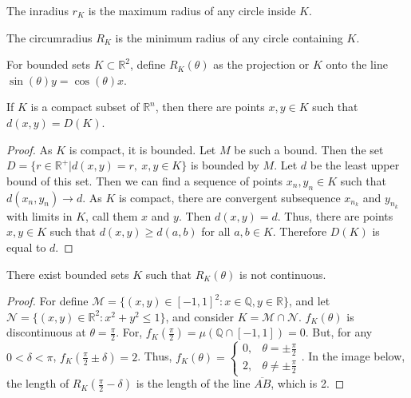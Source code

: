 \documentclass[crop=false,class=book,oneside]{standalone}
\begin{document}
            \begin{definition}
            The inradius $r_K$ is the maximum radius of any circle inside $K$.
            \end{definition}
            \begin{definition}
            The circumradius $R_K$ is the minimum radius of any circle containing $K$.
            \end{definition}
            \begin{notation}
            For bounded sets $K\subset \mathbb{R}^2$, define $R_K(\theta)$ as the projection or $K$ onto the line $\sin(\theta)y=\cos(\theta)x$.
            \end{notation}
            \begin{theorem}
            If $K$ is a compact subset of $\mathbb{R}^n$, then there are points $x,y\in K$ such that $d(x,y)=D(K)$.
            \end{theorem}
            \begin{proof}
            As $K$ is compact, it is bounded. Let $M$ be such a bound. Then the set $D=\{r\in \mathbb{R}^+| d(x,y) = r,\ x,y\in K\}$ is bounded by $M$. Let $d$ be the least upper bound of this set. Then we can find a sequence of points $x_n,y_n\in K$ such that $d(x_n,y_n) \rightarrow d$. As $K$ is compact, there are convergent subsequence $x_{n_k}$ and $y_{n_k}$ with limits in $K$, call them $x$ and $y$. Then $d(x,y) = d$. Thus, there are points $x,y\in K$ such that $d(x,y) \geq d(a,b)$ for all $a,b\in K$. Therefore $D(K)$ is equal to $d$.
            \end{proof}
            \begin{theorem}
            There exist bounded sets $K$ such that $R_K(\theta)$ is not continuous.
            \end{theorem}
            \begin{proof}
            For define $\mathcal{M} = \{(x,y)\in [-1,1]^2: x\in \mathbb{Q},y\in \mathbb{R}\}$, and let $\mathcal{N} = \{(x,y)\in \mathbb{R}^2: x^2+y^2\leq 1\}$, and consider $K = \mathcal{M}\cap \mathcal{N}$. $f_{K}(\theta)$ is discontinuous at $\theta = \frac{\pi}{2}$. For, $f_K(\frac{\pi}{2}) = \mu(\mathbb{Q}\cap [-1,1])=0$. But, for any $0<\delta < \pi$, $f_K(\frac{\pi}{2}\pm\delta) = 2$. Thus, $f_K(\theta) = \begin{cases} 0, & \theta = \pm \frac{\pi}{2} \\ 2, & \theta \ne \pm \frac{\pi}{2}\end{cases}$. In the image below, the length of $R_K(\frac{\pi}{2}-\delta)$ is the length of the line $\overline{AB}$, which is 2.
            \end{proof}
\end{document}
